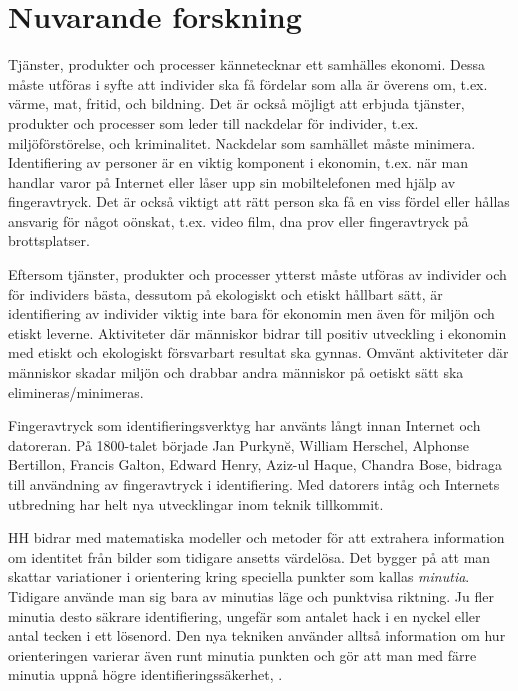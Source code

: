 \documentclass{article}
\begin{document}
\section{Nuvarande forskning}
\label{sc:nuvarande}
Tjänster, produkter och processer kännetecknar ett samhälles ekonomi. Dessa måste utföras i syfte att individer ska få fördelar som alla är överens om, t.ex. värme, mat, fritid, och bildning.
Det är också möjligt att erbjuda tjänster, produkter och processer som
leder till nackdelar för individer, t.ex.  miljöförstörelse, och
kriminalitet. Nackdelar som samhället måste minimera.
Identifiering av personer är en viktig komponent i ekonomin, t.ex. när man handlar varor på Internet eller låser upp sin mobiltelefonen med hjälp av fingeravtryck. Det är också viktigt att rätt person ska få en viss fördel eller hållas ansvarig för något oönskat, t.ex. video film, dna prov eller fingeravtryck på brottsplatser.

Eftersom tjänster, produkter och processer ytterst måste utföras av
individer och för individers bästa, dessutom på ekologiskt och etiskt hållbart sätt, är  identifiering av individer viktig inte bara för ekonomin men
även för miljön och etiskt leverne.  Aktiviteter där människor bidrar till positiv utveckling i ekonomin med  etiskt och ekologiskt försvarbart resultat ska gynnas.
Omvänt aktiviteter där människor skadar miljön och drabbar andra människor på oetiskt sätt ska
elimineras/minimeras. 

Fingeravtryck som identifieringsverktyg har använts
långt innan Internet och datoreran. På 1800-talet började  Jan Purkyn\u{e}, William Herschel, Alphonse Bertillon, Francis Galton,  Edward Henry, Aziz-ul  Haque, Chandra Bose, \cite{locard} bidraga till användning av fingeravtryck i identifiering.
Med datorers intåg och Internets utbredning har helt nya  utvecklingar inom teknik tillkommit.

HH bidrar med
matematiska modeller och metoder för att extrahera information om identitet från bilder som tidigare ansetts värdelösa. Det bygger på
att man skattar variationer i orientering kring speciella punkter som kallas \emph{minutia}. Tidigare använde man sig bara av
minutias läge och punktvisa riktning. Ju fler minutia desto säkrare
identifiering, ungefär som antalet hack i en nyckel eller antal
tecken i ett lösenord. Den nya tekniken använder 
alltså information om hur orienteringen varierar även runt minutia punkten och gör att man med färre minutia uppnå högre identifieringssäkerhet, \cite{mikaelyan14darmstadt}.
\end{document}
